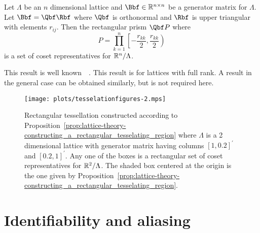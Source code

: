 \documentclass[journal]{IEEEtran}
\begin{document}
\begin{proposition}\label{prop:lattice-theory-constructing_a_rectangular_tesselating_region}
Let  $\Lambda$ be an $n$ dimensional lattice and $\Bbf \in \reals^{n\times n}$ be a generator matrix for $\Lambda$. Let $\Bbf = \Qbf\Rbf$ where $\Qbf$ is orthonormal and $\Rbf$ is upper triangular with elements $r_{ij}$.  Then the rectangular prism $\Qbf P$ where
\[
P = \prod_{k=1}^{n}{\left[-\frac{r_{kk}}{2}, \frac{r_{kk}}{2}\right)}
\]
is a set of coset representatives for ${\mathbb R}^n / \Lambda$.
\end{proposition}
\begin{IEEEproof}
This result is well known~\cite[Chapter IX, Theorem IV]{Cassels_geom_numbers_1997}~\cite[Proposition 2.1]{McKilliam2010thesis}.  This result is for lattices with full rank.  A result in the general case can be obtained similarly, but is not required here.  
\end{IEEEproof}

\begin{figure}[tp]
	\centering
		\texttt{[image: plots/tesselationfigures-2.mps]}
		\caption{Rectangular tessellation constructed according to Proposition~\ref{prop:lattice-theory-constructing_a_rectangular_tesselating_region} where $\Lambda$ is a 2 dimensional lattice with generator matrix having columns $[1, 0.2]^\prime$ and $[0.2, 1]^\prime$. Any one of the boxes is a rectangular set of coset representatives for ${\mathbb R}^2 / \Lambda$.  The shaded box centered at the origin is the one given by Proposition~\ref{prop:lattice-theory-constructing_a_rectangular_tesselating_region}.}
		\label{lattices:fig:tessellation2}
\end{figure} 

\section{Identifiability and aliasing}\label{sec:ident_aliasing}
\end{document}
